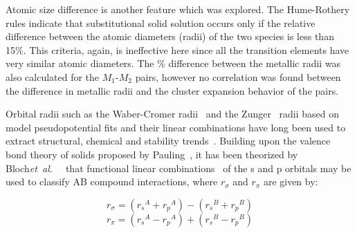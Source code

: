\documentclass[preprint,amsmath,amssymb,aps, prb,showkeys]{revtex4-1}
\def\etal{\mbox{\it et al.\ }}
\begin{document}
Atomic size difference is another feature which was explored. The Hume-Rothery rules indicate that substitutional solid solution occurs only if the relative difference between the atomic diameters (radii) of the two species is
less than 15\%. This criteria, again, is ineffective here since all the transition elements have very similar atomic diameters. The \% difference between the metallic radii was also calculated for the $M_1$-$M_2$ pairs, however no correlation was found between the difference in metallic radii and the cluster expansion behavior of the pairs.
 
Orbital radii such as the Waber-Cromer radii~\cite{waber1965orbital} and the Zunger~\cite{zunger1980systematization} radii based on model pseudopotential fits  and their linear combinations have long been used to extract structural, chemical and stability trends~\cite{bloch1972structural}. Building upon the valence bond theory of solids proposed by Pauling~\cite{pauling1932nature}, it has been theorized by Bloch\etal~\cite{bloch1972structural} that functional linear combinations~\cite{chelikowsky1978quantum} of the s and p orbitals may be used to classify AB compound interactions, where $r_{\sigma}$ and $r_{\pi}$ are given by:

\begin{equation}
r_{\sigma} = ({r_s}^A +{r_p}^A) - ({r_s}^B +{r_p}^B) 
\end{equation}
\begin{equation}
r_{\pi} = ({r_s}^A -{r_p}^A) + ({r_s}^B -{r_p}^B)
\end{equation}
\end{document}
